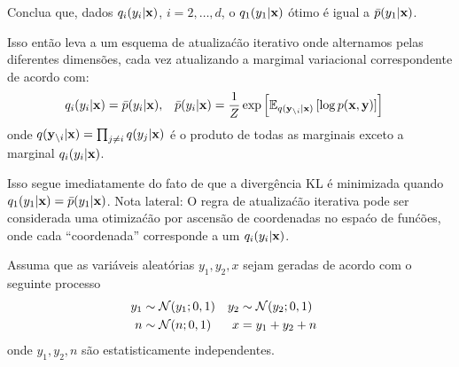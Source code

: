 \begin{exenumerate}
\begin{solution}
    \end{solution}
    
    \item Conclua que, dados $q_i(y_i|\mathbf{x})$, $i=2, \ldots, d$, o $q_1(y_1|\mathbf{x})$ \'otimo \'e igual a $\bar{p}(y_1|\mathbf{x})$.
    
    Isso ent\~ao leva a um esquema de atualiza\'c\~ao iterativo onde alternamos
    pelas diferentes dimens\~oes, cada vez atualizando a margimal variacional correspondente de acordo com:
    \begin{align}
        q_i(y_i|\mathbf{x}) &=  \bar{p}(y_i|\mathbf{x}), &  \bar{p}(y_i|\mathbf{x}) &= \frac{1}{Z} \exp\left[ \mathbb{E}_{q(\mathbf{y}_{\setminus i}|\mathbf{x})}\left[ \log p(\mathbf{x},\mathbf{y})\right] \right]
    \end{align}
    onde $q(\mathbf{y}_{\setminus i}|\mathbf{x}) = \prod_{j \neq i} q(y_j | \mathbf{x})$ \'e o produto de todas as marginais exceto a marginal $q_i(y_i|\mathbf{x})$.
    
    \begin{solution}
        Isso segue imediatamente do fato de que a diverg\^encia KL \'e
        minimizada quando $q_1(y_1|\mathbf{x}) = \bar{p}(y_1|\mathbf{x})$. Nota lateral: O
        regra de atualiza\'c\~ao iterativa pode ser considerada uma otimiza\'c\~ao por
        ascens\~ao de coordenadas no espa\'co de fun\'c\~oes, onde cada ``coordenada''
        corresponde a um $q_i(y_i|\mathbf{x})$.
        
    \end{solution}
\end{exenumerate}


Assuma que as vari\'aveis aleat\'orias $y_1, y_2, x$ sejam geradas de acordo com o seguinte processo
\begin{align}
    y_1 &\sim \mathcal{N}(y_1; 0, 1) &   y_2 &\sim \mathcal{N}(y_2; 0, 1) \\
    n &\sim \mathcal{N}(n; 0, 1)    &    x & = y_1+y_2+n & 
\end{align}
onde $y_1, y_2, n$ s\~ao estatisticamente independentes.

